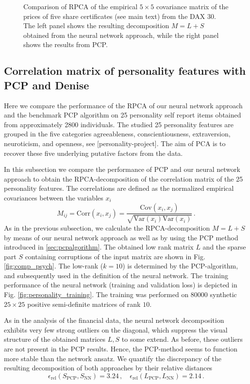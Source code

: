 \begin{figure}
	\caption{Comparison of RPCA of the empirical $5\times 5$ covariance matrix of the prices of five share certificates (see main text) from the DAX 30. The left panel shows the resulting decomposition $M=L+S$ obtained from the neural network approach, while the right panel shows the results from PCP.}
	\label{fig:comp_finance}
\end{figure}


\subsection{Correlation matrix of personality features with PCP and Denise}
Here we compare the performance of the RPCA of our neural network approach and the benchmark PCP algorithm on 25 personality self report items obtained from approximately 2800 individuals. The studied 25 personality features are grouped in the five categories agreeableness, conscientiousness, extraversion, neuroticism, and openness, see \href{https://www.personality-project.org/r/html/bfi.html}[personality-project]. The aim of PCA is to recover these five underlying putative factors from the data.

In this subsection we compare the performance of PCP and our neural network approach to obtain the RPCA-decomposition of the correlation matrix of the 25 personality features. The correlations are defined as the normalized empirical covariances between the variables $x_i$
\[
M_{ij} = \text{Corr}(x_i,x_j) = \frac{\text{Cov}(x_i,x_j)}{\sqrt{\text{Var}(x_i) \text{Var}(x_i)}} \,.
\]
As in the previous subsection, we calculate the RPCA-decomposition $M=L + S$ by means of our neural network approach as well as by using the PCP method introduced in \ref{sec:pcpalgorithm}. The obtained low rank matrix $L$ and the sparse part $S$ containing corruptions of the input matrix are shown in Fig. \ref{fig:comp_psych}. The low-rank ($k=10$) is determined by the PCP-algorithm, and subsequently used in the definition of the neural network. The training performance of the neural network (training and validation loss) is depicted in Fig. \ref{fig:personality_training}. The training was performed on 80000 synthetic $25\times 25$ positive semi-definite matrices of rank $10$.

As in the analysis of the financial data, the neural network decomposition exhibits very few strong outliers on the diagonal, which suppress the visual structure of the obtained matrices $L,S$ to some extend. As before, these outliers are not present in the PCP results. Hence, the PCP-method seems to function more stable than the network ansatz. We quantify the discrepancy of the resulting decomposition of both approaches by their relative distances
\begin{equation}
\epsilon_\text{rel}(S_\text{PCP},S_\text{NN}) = 3.24 \,, \quad  \epsilon_\text{rel}(L_\text{PCP},L_\text{NN}) = 2.14 \,.
\end{equation}

